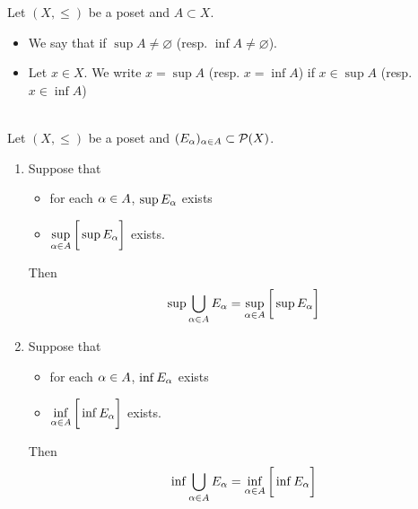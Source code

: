 \documentclass{book}
\begin{document}
	\begin{defn} 
		Let $(X, \leq)$ be a poset and $A \subset X$. 
		\begin{itemize}
			\item We say that  if $\sup A \neq \varnothing$ (resp. $\inf A \neq \varnothing$).
			\item Let $x \in X$. We write $x = \sup A$ (resp. $x = \inf A$) if $x \in \sup A$ (resp. $x \in \inf A$)
		\end{itemize}
	\end{defn}
	
	\begin{ex}   \\
		Let $(X, \leq)$ be a poset and $(E_{\alpha})_{\alpha \in A} \subset \mathcal{P}(X)$. 
		\begin{enumerate}
			\item Suppose that 
			\begin{itemize}
				\item for each $\alpha \in A$, $\sup E_{\alpha}$ exists
				\item $\sup\limits_{\alpha \in A} \bigg[ \sup E_{\alpha} \bigg]$ exists.
			\end{itemize}
			Then 
			$$\sup \bigcup\limits_{\alpha \in A} E_{\alpha} = \sup\limits_{\alpha \in A} \bigg[ \sup E_{\alpha} \bigg]$$
			\item Suppose that 
			\begin{itemize}
				\item for each $\alpha \in A$, $\inf E_{\alpha}$ exists
				\item $\inf\limits_{\alpha \in A} \bigg[ \inf E_{\alpha} \bigg]$ exists.
			\end{itemize}
			Then 
			$$\inf \bigcup\limits_{\alpha \in A} E_{\alpha} = \inf\limits_{\alpha \in A} \bigg[ \inf E_{\alpha} \bigg]$$
		\end{enumerate}
	\end{ex}
	
\end{document}
